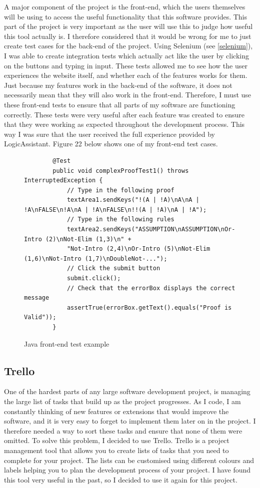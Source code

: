 A major component of the project is the front-end, which the users themselves will be using to access the useful functionality that this software provides. This part of the project is very important as the user will use this to judge how useful this tool actually is. I therefore considered that it would be wrong for me to just create test cases for the back-end of the project. Using Selenium (see \ref{selenium}), I was able to create integration tests which actually act like the user by clicking on the buttons and typing in input. These tests allowed me to see how the user experiences the website itself, and whether each of the features works for them. Just because my features work in the back-end of the software, it does not necessarily mean that they will also work in the front-end. Therefore, I must use these front-end tests to ensure that all parts of my software are functioning correctly. These tests were very useful after each feature was created to ensure that they were working as expected throughout the development process. This way I was sure that the user received the full experience provided by LogicAssistant. Figure 22 below shows one of my front-end test cases.

\begin{figure}[!ht]
\begin{lstlisting}
		@Test
		public void complexProofTest1() throws InterruptedException {
			// Type in the following proof
			textArea1.sendKeys("!(A | !A)\nA\nA | !A\nFALSE\n!A\nA | !A\nFALSE\n!!(A | !A)\nA | !A");
			// Type in the following rules
			textArea2.sendKeys("ASSUMPTION\nASSUMPTION\nOr-Intro (2)\nNot-Elim (1,3)\n" + 
			"Not-Intro (2,4)\nOr-Intro (5)\nNot-Elim (1,6)\nNot-Intro (1,7)\nDoubleNot-...");
			// Click the submit button
			submit.click();
			// Check that the errorBox displays the correct message
			assertTrue(errorBox.getText().equals("Proof is Valid"));
		}
\end{lstlisting}

\caption{Java front-end test example}
\end{figure}

\subsection{Trello \label{trello}}

One of the hardest parts of any large software development project, is managing the large list of tasks that build up as the project progresses. As I code, I am constantly thinking of new features or extensions that would improve the software, and it is very easy to forget to implement them later on in the project. I therefore needed a way to sort these tasks and ensure that none of them were omitted. To solve this problem, I decided to use Trello. Trello is a project management tool that allows you to create lists of tasks that you need to complete for your project. The lists can be customised using different colours and labels helping you to plan the development process of your project. I have found this tool very useful in the past, so I decided to use it again for this project.

